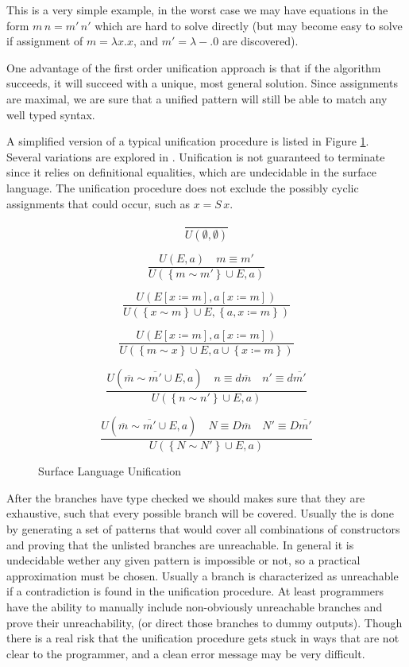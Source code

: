 This is a very simple example, in the worst case we may have equations
in the form $m\,n=m'\,n'$ which are hard to solve directly (but may
become easy to solve if assignment of $m=\lambda x.x$, and $m'=\lambda-.0$
are discovered).

One advantage of the first order unification approach is that if the
algorithm succeeds, it will succeed with a unique, most general solution.
Since assignments are maximal, we are sure that a unified pattern
will still be able to match any well typed syntax.

A simplified version of a typical unification procedure is listed
in Figure \ref{fig:surface-data-unification}. Several variations
are explored in \cite{cockx_devriese_2018}. Unification is not guaranteed
to terminate since it relies on definitional equalities, which are
undecidable in the surface language. The unification procedure does
not exclude the possibly cyclic assignments that could occur, such
as $x=S\,x$. 

\begin{figure}
\[
\frac{\,}{U\left(\emptyset,\emptyset\right)}
\]

\[
\frac{U\left(E,a\right)\quad m\equiv m'}{U\left(\left\{ m\sim m'\right\} \cup E,a\right)}
\]

\[
\frac{U\left(E\left[x\coloneqq m\right],a\left[x\coloneqq m\right]\right)}{U\left(\left\{ x\sim m\right\} \cup E,\left\{ a,x\coloneqq m\right\} \right)}
\]

\[
\frac{U\left(E\left[x\coloneqq m\right],a\left[x\coloneqq m\right]\right)}{U\left(\left\{ m\sim x\right\} \cup E,a\cup\left\{ x\coloneqq m\right\} \right)}
\]

\[
\frac{U\left(\overline{m}\sim\overline{m'}\cup E,a\right)\quad n\equiv d\overline{m}\quad n'\equiv d\overline{m'}}{U\left(\left\{ n\sim n'\right\} \cup E,a\right)}
\]

\[
\frac{U\left(\overline{m}\sim\overline{m'}\cup E,a\right)\quad N\equiv D\overline{m}\quad N'\equiv D\overline{m'}}{U\left(\left\{ N\sim N'\right\} \cup E,a\right)}
\]

\caption{Surface Language Unification}
\label{fig:surface-data-unification}
\end{figure}

After the branches have type checked we should makes sure that they
are exhaustive, such that every possible branch will be covered. Usually
the is done by generating a set of patterns that would cover all combinations
of constructors and proving that the unlisted branches are unreachable.
In general it is undecidable wether any given pattern is impossible
or not, so a practical approximation must be chosen. Usually a branch
is characterized as unreachable if a contradiction is found in the
unification procedure. At least programmers have the ability to manually
include non-obviously unreachable branches and prove their unreachability,
(or direct those branches to dummy outputs). Though there is a real
risk that the unification procedure gets stuck in ways that are not
clear to the programmer, and a clean error message may be very difficult.

